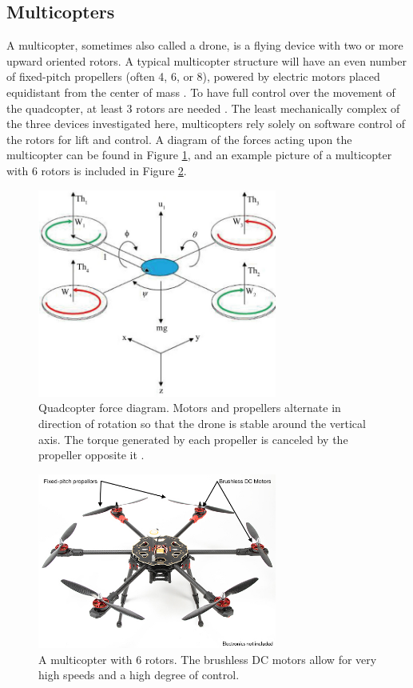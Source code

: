 \subsection{Multicopters}
A multicopter, sometimes also called a drone, is a flying device with two or more upward oriented rotors. A typical multicopter structure will have an even number of fixed-pitch propellers (often 4, 6, or 8), powered by electric motors placed equidistant from the center of mass \cite{multicopter_background}. To have full control over the movement of the quadcopter, at least 3 rotors are needed \cite{multicopter_dynamics_2}. The least mechanically complex of the three devices investigated here, multicopters rely solely on software control of the rotors for lift and control. A diagram of the forces acting upon the multicopter can be found in Figure \ref{fig:quad_diagram}, and an example picture of a multicopter with 6 rotors is included in Figure \ref{fig:multicopter_hex}.\par
\begin{figure}[ht]
\centering
\includegraphics[width=0.70\textwidth]{img/quad_force_diagram.jpg}
\caption{Quadcopter force diagram. Motors and propellers alternate in direction of rotation so that the drone is stable around the vertical axis. The torque generated by each propeller is canceled by the propeller opposite it \cite{multicopter_dynamics_3}.}
\label{fig:quad_diagram}
\end{figure}\par
\begin{figure}[ht]
\centering
\includegraphics[width=0.70\textwidth]{img/hexacopter.jpg}
\caption{A multicopter with 6 rotors. The brushless DC motors allow for very high speeds and a high degree of control. \cite{multicopter_img}}
\label{fig:multicopter_hex}
\end{figure}\par
